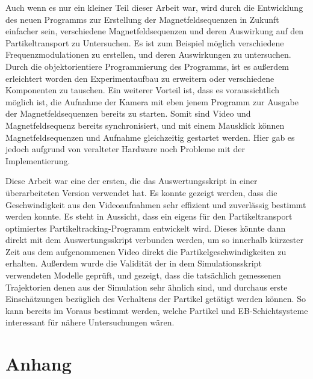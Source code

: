 \documentclass[page,pdftex,12pt,a4paper,twoside,openright]{scrbook}
\begin{document}
Auch wenn es nur ein kleiner Teil dieser Arbeit war, wird durch die Entwicklung des neuen Programms zur Erstellung der Magnetfeldsequenzen in Zukunft einfacher sein, verschiedene Magnetfeldsequenzen und deren Auswirkung auf den Partikeltransport zu Untersuchen. Es ist zum Beispiel möglich verschiedene Frequenzmodulationen zu erstellen, und deren Auswirkungen zu untersuchen. Durch die objektorientiere Programmierung des Programms, ist es außerdem erleichtert worden den Experimentaufbau zu erweitern oder verschiedene Komponenten zu tauschen.
Ein weiterer Vorteil ist, dass es voraussichtlich möglich ist, die Aufnahme der Kamera mit eben jenem Programm zur Ausgabe der Magnetfeldsequenzen bereits zu starten. Somit sind Video und Magnetfeldsequenz bereits synchronisiert, und mit einem Mausklick können Magnetfeldsequenzen und Aufnahme gleichzeitig gestartet werden. Hier gab es jedoch aufgrund von veralteter Hardware noch Probleme mit der Implementierung.

Diese Arbeit war eine der ersten, die das Auswertungsskript \cite{holzinger_pythonscript_nodate} in einer überarbeiteten Version verwendet hat. Es konnte gezeigt werden, dass die Geschwindigkeit aus den Videoaufnahmen sehr effizient und zuverlässig bestimmt werden konnte. Es steht in Aussicht, dass ein eigens für den Partikeltransport optimiertes Partikeltracking-Programm entwickelt wird. Dieses könnte dann direkt mit dem Auswertungsskript verbunden werden, um so innerhalb kürzester Zeit aus dem aufgenommenen Video direkt die Partikelgeschwindigkeiten zu erhalten.
Außerdem wurde die Validität der in dem Simulationsskript \cite{holzinger_pythonscript_nodate-1} verwendeten Modelle geprüft, und gezeigt, dass die tatsächlich gemessenen Trajektorien denen aus der Simulation sehr ähnlich sind, und durchaus erste Einschätzungen bezüglich des Verhaltens der Partikel getätigt werden können. So kann bereits im Voraus bestimmt werden, welche Partikel und EB-Schichtsysteme interessant für nähere Untersuchungen wären.
\chapter{Anhang}
\label{sec:orge3448ab}
\end{document}
